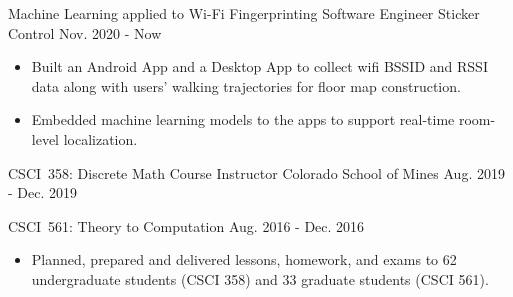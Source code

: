 

\begin{cventries}
	
	\cventry
	{Machine Learning applied to Wi-Fi Fingerprinting} %
	{Software Engineer} %
	{Sticker Control} %
	{Nov. 2020 - Now} %
	{\vspace{-.16in}
	\begin{itemize}[leftmargin=*]
		\item Built an Android App and a Desktop App to collect wifi BSSID and RSSI data along with users' walking trajectories for floor map construction.
		\item Embedded machine learning models to the apps to support real-time room-level localization.
		\vspace{-.16in}
	\end{itemize}}
	
	\cventry
	{CSCI~358: Discrete Math} %
	{Course Instructor} %
	{Colorado School of Mines} %
	{Aug. 2019 - Dec. 2019} %
	{\quad}

	\vspace{-.4in}\cventry	
	{CSCI~561: Theory to Computation} %
	{\quad} %
	{\quad} %
	{Aug. 2016 - Dec. 2016} %
	{\vspace{-.16in}
		\begin{itemize}[leftmargin=*]
			\item Planned, prepared and delivered lessons, homework, and exams to 62 undergraduate students (CSCI 358) and 33 graduate students (CSCI 561).
			\vspace{-.16in}
	\end{itemize}}
	
	
\end{cventries}
